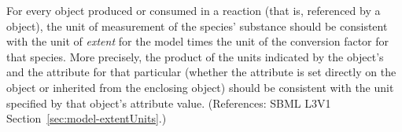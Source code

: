 For every \Species object produced or consumed in a reaction (that is, referenced
by a \SpeciesReference object), the unit of
measurement of the species' substance should be consistent with the unit of 
\emph{extent} for the model times the unit of the conversion
factor for that species.  More precisely, the product of the units indicated by the
\Model object's  and the  attribute for
that particular \Species (whether
the attribute is set directly on the \Species object or inherited from
the enclosing \Model object) should be consistent with the unit specified
by that \Species object's  attribute value.  (References:
SBML L3V1 Section~\ref{sec:model-extentUnits}.)
